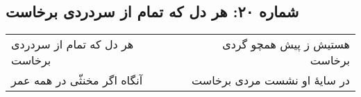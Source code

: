 \begin{center}
\section*{شماره ۲۰: هر دل که تمام از سردردی برخاست}
\label{sec:020}
\begin{longtable}{l p{0.5cm} r}
هر دل که تمام از سردردی برخاست
&&
هستیش ز پیش همچو گردی برخاست
\\
آنگاه اگر مخنثّی در همه عمر
&&
در سایهٔ او نشست مردی برخاست
\\
\end{longtable}
\end{center}
